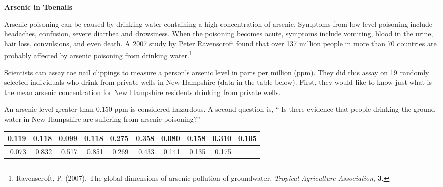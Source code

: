 \def\theTopic{Arsenic}
\def\dayNum{16 }

\begin{center}
{\bf {\large Arsenic in Toenails}}
\end{center}

Arsenic poisoning can be caused by drinking water containing
a high concentration of arsenic.  Symptoms from
low-level poisoning include headaches, confusion, severe diarrhea and
drowsiness.  When the poisoning becomes acute, symptoms include
vomiting, blood in the urine, hair loss, convulsions, and even death.
A 2007 study by Peter Ravenscroft found that over 137 million people
in more than 70 countries are probably affected by arsenic poisoning
from drinking water.\footnote{Ravenscroft, P. (2007). The global
  dimensions of arsenic pollution of groundwater. {\em Tropical
    Agriculture Association}, {\bf 3}.}

Scientists can assay toe nail clippings to measure a person's arsenic
level in parts per million (ppm).  They did this assay on 19 randomly selected 
individuals who drink from private wells in New Hampshire (data in the
table below). First, they would like to know just what is the mean arsenic 
concentration for New Hampshire residents drinking from private wells.

 An arsenic level greater than 0.150 ppm is considered
hazardous. A second question is, `` Is there evidence that people
drinking the ground water in New Hampshire are suffering from arsenic
poisoning?''



\begin{center}
\begin{tabular}{|r|r|r|r|r|r|r|r|r|r|} \hline
0.119& 0.118& 0.099& 0.118& 0.275& 0.358& 0.080& 0.158& 0.310& 0.105
\\ \hline
0.073& 0.832& 0.517& 0.851& 0.269& 0.433& 0.141& 0.135& 0.175 & \\ \hline
\end{tabular}  
\end{center}


